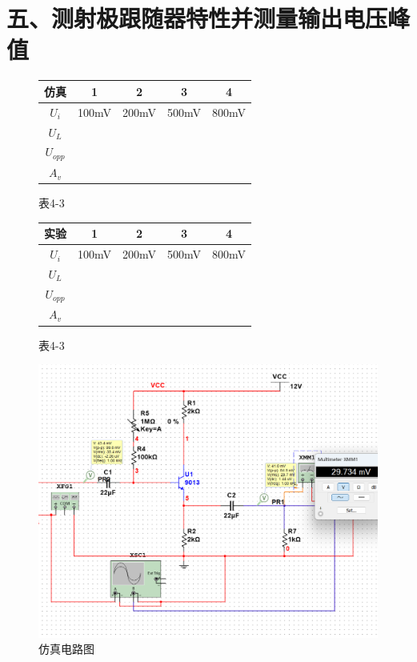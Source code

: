 \documentclass[a4paper,10pt,notitlepage]{article}
\begin{document}
	\section*{五、测射极跟随器特性并测量输出电压峰值}
	\begin{figure}[h]
		\begin{minipage}{0.3\textwidth}
			\begin{tabular}{|c|c|c|c|c|}
				\hline
				仿真 & 1 & 2 & 3 & 4 \\
				\hline
				$U_i$ & 100mV & 200mV & 500mV & 800mV  \\
				\hline
				$U_L$ & \quad & \quad & \qquad & \quad \\
				\hline
				$U_{opp}$ & \quad & \quad & \quad & \quad \\
				\hline
				$A_v$ & \quad & \quad & \quad & \quad \\
				\hline
			\end{tabular}
			\caption*{表4-3}
		\end{minipage}
		\hspace{4cm}
		\begin{minipage}{0.3\textwidth}
			\begin{tabular}{|c|c|c|c|c|}
				\hline
				实验 & 1 & 2 & 3 & 4 \\
				\hline
				$U_i$ & 100mV & 200mV & 500mV & 800mV  \\
				\hline
				$U_L$ & \quad & \quad & \qquad & \quad \\
				\hline
				$U_{opp}$ & \quad & \quad & \quad & \quad \\
				\hline
				$A_v$ & \quad & \quad & \quad & \quad \\
				\hline
			\end{tabular}
			\caption*{表4-3}
		\end{minipage}
	\end{figure}
	\begin{figure}[h]
		\centering
		\begin{minipage}{0.6\textwidth}
			\centering
			\includegraphics[width=\textwidth]{11.png}
			\caption*{仿真电路图}
		\end{minipage}
	\end{figure}
	
\end{document}
